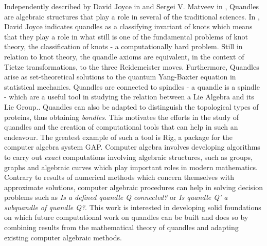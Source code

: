 \documentclass{mcom-l}
\begin{document}
\noindent
Independently described by David Joyce in \cite{JOYCE198237} and Sergei V. Matveev in \cite{SergeiMatveevDisGrou}, Quandles are algebraic structures that play a role in several of the traditional sciences. In \cite{JOYCE198237}, David Joyce indicates quandles as a classifying invariant of knots which means that they play a role in what still is one of the fundamental problems of knot theory, the classification of knots - a computationally hard problem. Still in relation to knot theory, the quandle axioms are equivalent, in the context of Tietze transformations, to the three Reidemeister moves\cite{lie2algebras, nelson2005signed}. Furthermore, Quandles arise as set-theoretical solutions to the quantum Yang-Baxter equation in statistical mechanics\cite{BONATTO2021128}. Quandles are connected to spindles - a quandle is a spindle - which are a useful tool in studying the relation between a Lie Algebra and its Lie Group.\cite{lie2algebras}. Quandles can also be adapted to distinguish the topological types of proteins, thus obtaining \emph{bondles}\cite{adams2020knot}. This motivates the efforts in the study of quandles and the creation of computational tools that can help in such an endeavour. The greatest example of such a tool is \textsf{Rig}\cite{RiGapVendramin}, a package for the computer algebra system \textsf{GAP}\cite{GAPLinton}. Computer algebra involves developing algorithms to carry out \emph{exact} computations involving algebraic structures, such as groups, graphs and algebraic curves which play important roles in modern mathematics. Contrary to results of numerical methods which concern themselves with approximate solutions, computer algebraic procedures can help in solving decision problems such as \textit{Is a defined quandle Q connected?} or \textit{Is quandle Q' a subquandle of quandle Q?}. This work is interested in developing solid foundations on which future computational work on quandles can be built and does so by combining results from the mathematical theory of quandles and adapting existing computer algebraic methods.
\end{document}
